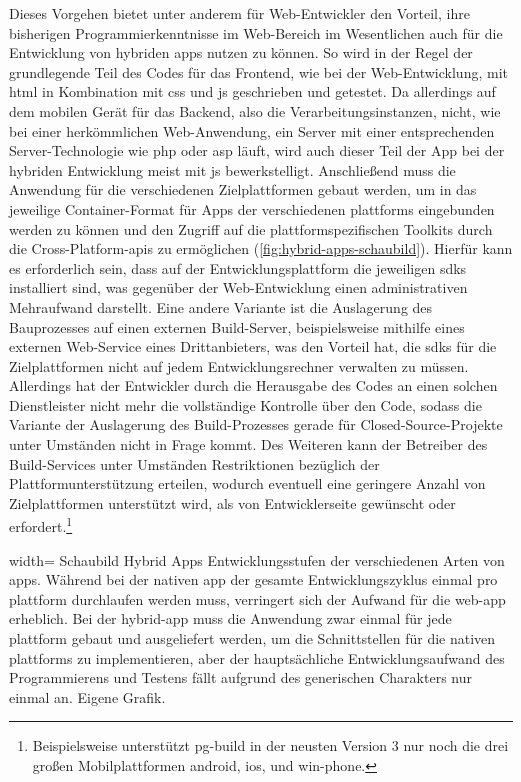 Dieses Vorgehen bietet unter anderem für Web-Entwickler den Vorteil, ihre bisherigen Programmierkenntnisse im Web-Bereich im Wesentlichen auch für die Entwicklung von hybriden \glspl{app} nutzen zu können. 
So wird in der Regel der grundlegende Teil des Codes für das Frontend, wie bei der Web-Entwicklung, mit \gls{html} in Kombination mit \gls{css} und \gls{js} geschrieben und getestet. 
Da allerdings auf dem mobilen Gerät für das Backend, also die Verarbeitungsinstanzen, nicht, wie bei einer herkömmlichen Web-Anwendung, ein Server mit einer entsprechenden Server-Technologie wie \gls{php} oder \gls{asp} läuft, wird auch dieser Teil der App bei der hybriden Entwicklung meist mit \gls{js} bewerkstelligt. 
Anschließend muss die Anwendung für die verschiedenen Zielplattformen gebaut werden, um in das jeweilige Container-Format für Apps der verschiedenen \glspl{plattform} eingebunden werden zu können und den Zugriff auf die plattformspezifischen Toolkits durch die Cross-Platform-\glspl{api} zu ermöglichen (\autoref{fig:hybrid-apps-schaubild}).
Hierfür kann es erforderlich sein, dass auf der Entwicklungsplattform die jeweiligen \glspl{sdk} installiert sind, was gegenüber der Web-Entwicklung einen administrativen Mehraufwand darstellt.
Eine andere Variante ist die Auslagerung des Bauprozesses auf einen externen Build-Server, beispielsweise mithilfe eines externen Web-Service eines Drittanbieters, was den Vorteil hat, die \glspl{sdk} für die Zielplattformen nicht auf jedem Entwicklungsrechner verwalten zu müssen. 
Allerdings hat der Entwickler durch die Herausgabe des Codes an einen solchen Dienstleister nicht mehr die vollständige Kontrolle über den Code, sodass die Variante der Auslagerung des Build-Prozesses gerade für Closed-Source-Projekte unter Umständen nicht in Frage kommt. 
Des Weiteren kann der Betreiber des Build-Services unter Umständen Restriktionen bezüglich der Plattformunterstützung erteilen, wodurch eventuell eine geringere Anzahl von Zielplattformen unterstützt wird, als von Entwicklerseite gewünscht oder erfordert.\footnote{Beispielsweise unterstützt \gls{pg-build} in der neusten Version 3 nur noch die drei großen Mobilplattformen \gls{android}, \gls{ios}, und \gls{win-phone}.}

	{width=\fullimagesize}
	{Schaubild Hybrid Apps}
		{Entwicklungsstufen der verschiedenen Arten von \glspl{app}. Während bei der nativen \gls{app} der gesamte Entwicklungszyklus einmal pro \gls{plattform} durchlaufen werden muss, verringert sich der Aufwand für die \gls{web-app} erheblich. Bei der \gls{hybrid-app} muss die Anwendung zwar einmal für jede \gls{plattform} gebaut und ausgeliefert werden, um die Schnittstellen für die nativen \glspl{plattform} zu implementieren, aber der hauptsächliche Entwicklungsaufwand des Programmierens und Testens fällt aufgrund des generischen Charakters nur einmal an.}
	{Eigene Grafik.}

